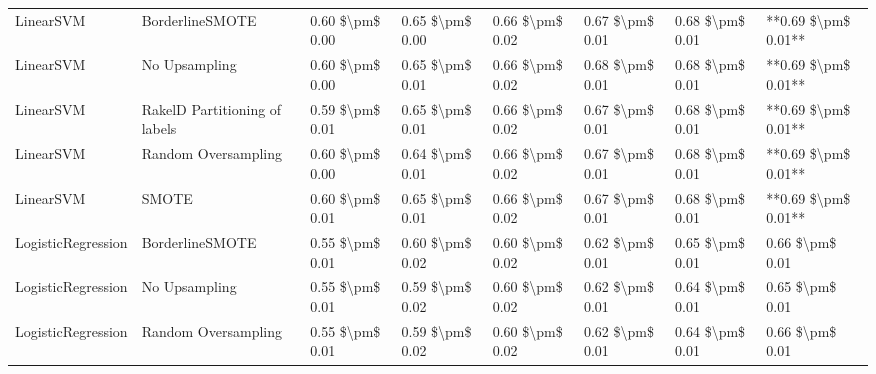 \begin{tabular}{llllllll}
                      LinearSVM &               BorderlineSMOTE & 0.60 \$\textbackslash pm\$ 0.00 &           0.65 \$\textbackslash pm\$ 0.00 &       0.66 \$\textbackslash pm\$ 0.02 &        0.67 \$\textbackslash pm\$ 0.01 &                         0.68 \$\textbackslash pm\$ 0.01 & **0.69 \$\textbackslash pm\$ 0.01** \\
                      LinearSVM &                 No Upsampling & 0.60 \$\textbackslash pm\$ 0.00 &           0.65 \$\textbackslash pm\$ 0.01 &       0.66 \$\textbackslash pm\$ 0.02 &        0.68 \$\textbackslash pm\$ 0.01 &                         0.68 \$\textbackslash pm\$ 0.01 & **0.69 \$\textbackslash pm\$ 0.01** \\
                      LinearSVM & RakelD Partitioning of labels & 0.59 \$\textbackslash pm\$ 0.01 &           0.65 \$\textbackslash pm\$ 0.01 &       0.66 \$\textbackslash pm\$ 0.02 &        0.67 \$\textbackslash pm\$ 0.01 &                         0.68 \$\textbackslash pm\$ 0.01 & **0.69 \$\textbackslash pm\$ 0.01** \\
                      LinearSVM &           Random Oversampling & 0.60 \$\textbackslash pm\$ 0.00 &           0.64 \$\textbackslash pm\$ 0.01 &       0.66 \$\textbackslash pm\$ 0.02 &        0.67 \$\textbackslash pm\$ 0.01 &                         0.68 \$\textbackslash pm\$ 0.01 & **0.69 \$\textbackslash pm\$ 0.01** \\
                      LinearSVM &                         SMOTE & 0.60 \$\textbackslash pm\$ 0.01 &           0.65 \$\textbackslash pm\$ 0.01 &       0.66 \$\textbackslash pm\$ 0.02 &        0.67 \$\textbackslash pm\$ 0.01 &                         0.68 \$\textbackslash pm\$ 0.01 & **0.69 \$\textbackslash pm\$ 0.01** \\
             LogisticRegression &               BorderlineSMOTE & 0.55 \$\textbackslash pm\$ 0.01 &           0.60 \$\textbackslash pm\$ 0.02 &       0.60 \$\textbackslash pm\$ 0.02 &        0.62 \$\textbackslash pm\$ 0.01 &                         0.65 \$\textbackslash pm\$ 0.01 &     0.66 \$\textbackslash pm\$ 0.01 \\
             LogisticRegression &                 No Upsampling & 0.55 \$\textbackslash pm\$ 0.01 &           0.59 \$\textbackslash pm\$ 0.02 &       0.60 \$\textbackslash pm\$ 0.02 &        0.62 \$\textbackslash pm\$ 0.01 &                         0.64 \$\textbackslash pm\$ 0.01 &     0.65 \$\textbackslash pm\$ 0.01 \\
             LogisticRegression &           Random Oversampling & 0.55 \$\textbackslash pm\$ 0.01 &           0.59 \$\textbackslash pm\$ 0.02 &       0.60 \$\textbackslash pm\$ 0.02 &        0.62 \$\textbackslash pm\$ 0.01 &                         0.64 \$\textbackslash pm\$ 0.01 &     0.66 \$\textbackslash pm\$ 0.01 \\

\end{tabular}
